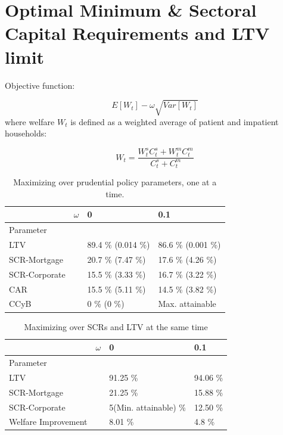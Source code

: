 \documentclass[12pt]{article}
\numberwithin{equation}{section}
\begin{document}
\section*{Optimal Minimum \& Sectoral Capital Requirements and LTV limit}

Objective function: 

$$ E[W_t] - \omega \sqrt{Var[W_t]} $$
where welfare $W_t$ is defined as a weighted average of patient and impatient households: 


$$ W_t = \frac{W^s_t C^s_t + W^m_t C^m_t}{C^s_t + C^m_t} $$

\begin{table}[h]

\caption{Maximizing over prudential policy parameters, one at a time.}
\label{optpolicy_table}
\begin{tabular}{l|l|l|l}

 & $\omega$ & 0 & 0.1   \\
 \hline
 \hline
Parameter & & &  \\
\hline
\hline
LTV &  & 89.4 \% (0.014 \%) & 86.6 \% (0.001 \%)  \\

SCR-Mortgage &  & 20.7 \% (7.47 \%) & 17.6 \% (4.26 \%) \\

SCR-Corporate & & 15.5 \% (3.33 \%) & 16.7 \% (3.22 \%) \\

CAR & & 15.5 \% (5.11 \%) & 14.5 \% (3.82 \%) \\

CCyB & & 0 \% (0 \%) & Max. attainable \\

\end{tabular}
\end{table}



\begin{table}[h]

\caption{Maximizing over SCRs and LTV at the same time}
\label{optpolicy_all}
\begin{tabular}{l|l|l|l}

 & $\omega$ & 0 & 0.1   \\
 \hline
 \hline
Parameter & & &  \\
\hline
\hline
LTV &  & 91.25 \%   &  94.06 \%  \\

SCR-Mortgage &  & 21.25 \%     & 15.88 \%   \\

SCR-Corporate & &  5(Min. attainable) \%  & 12.50 \%  \\

Welfare Improvement & & 8.01 \% & 4.8 \% \\

\end{tabular}
\end{table}
\end{document}

